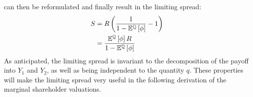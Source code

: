 \documentclass[../main.tex]{subfiles}
\begin{document}
         can then be reformulated and finally result in the limiting spread:
            \begin{align}
                    S
                &=
                    R
                    \left(
                        \frac{
                            1   
                        }{
                            1
                            -
                            \mathbb{E}^{\mathbb{Q}}\left[
                                \phi
                            \right]
                        }
                        - 
                        1
                    \right)
                \nonumber \\
                &=
                    \frac{
                        \mathbb{E}^{\mathbb{Q}}\left[\phi\right]
                        R
                    }{
                        1
                        -
                        \mathbb{E}^{\mathbb{Q}}\left[\phi\right]
                    }
            \end{align}
        As anticipated, the limiting spread is invariant to the decomposition of the payoff into $Y_{1}$ and $Y_{2}$,
        as well as being independent to the quantity $q$. 
        These properties will make the limiting spread very useful in the following derivation
        of the marginal shareholder valuations.
        
\end{document}
